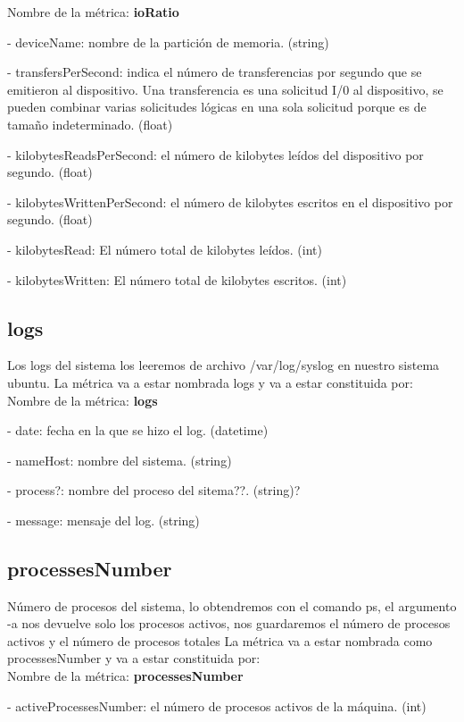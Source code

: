 \documentclass[ spanish, a4paper, 12pt, oneside]{report}
\begin{document}
Nombre de la métrica: \textbf{ioRatio}

\hyp{} deviceName: nombre de la partición de memoria. (string)

\hyp{} transfersPerSecond: indica el número de transferencias por segundo que se emitieron al dispositivo. 
Una transferencia es una solicitud I/0 al dispositivo, se pueden combinar varias solicitudes lógicas en una sola solicitud 
porque es de tamaño indeterminado. (float)

\hyp{} kilobytesReadsPerSecond: el número de kilobytes leídos del dispositivo por segundo. (float)

\hyp{} kilobytesWrittenPerSecond: el número de kilobytes escritos en el dispositivo por segundo. (float)

\hyp{} kilobytesRead: El número total de kilobytes leídos. (int)

\hyp{} kilobytesWritten: El número total de kilobytes escritos. (int)

\subsection{logs}
Los logs del sistema los leeremos de archivo /var/log/syslog en nuestro sistema ubuntu.
La métrica va a estar nombrada logs y va a estar constituida por:\\

Nombre de la métrica: \textbf{logs}

\hyp{} date: fecha en la que se hizo el log. (datetime)

\hyp{} nameHost: nombre del sistema. (string)

\hyp{} process?: nombre del proceso del sitema??. (string)?

\hyp{} message: mensaje del log. (string)

\subsection{processesNumber}
Número de procesos del sistema, lo obtendremos con el comando ps, el argumento -a nos devuelve solo los 
procesos activos, nos guardaremos el número de procesos activos y el número de procesos totales
La métrica va a estar nombrada como processesNumber y va a estar constituida por:\\
 
Nombre de la métrica: \textbf{processesNumber}
 
\hyp{} activeProcessesNumber: el número de procesos activos de la máquina. (int)
 
\end{document}
